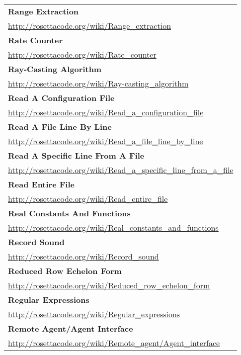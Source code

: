 \begin{longtable}{l}
\textbf{Range Extraction } \\ \href{http://rosettacode.org/wiki/Range\_extraction}{http://rosettacode.org/wiki/Range\_extraction} \\
\textbf{Rate Counter } \\ \href{http://rosettacode.org/wiki/Rate\_counter}{http://rosettacode.org/wiki/Rate\_counter} \\
\textbf{
Ray-Casting Algorithm } \\ \href{http://rosettacode.org/wiki/Ray-casting\_algorithm}{http://rosettacode.org/wiki/Ray-casting\_algorithm} \\
\textbf{Read A Configuration File } \\ \href{http://rosettacode.org/wiki/Read\_a\_configuration\_file}{http://rosettacode.org/wiki/Read\_a\_configuration\_file} \\
\textbf{
Read A File Line By Line } \\ \href{http://rosettacode.org/wiki/Read\_a\_file\_line\_by\_line}{http://rosettacode.org/wiki/Read\_a\_file\_line\_by\_line} \\
\textbf{Read A Specific Line From A File } \\ \href{http://rosettacode.org/wiki/Read\_a\_specific\_line\_from\_a\_file}{http://rosettacode.org/wiki/Read\_a\_specific\_line\_from\_a\_file} \\
\textbf{
Read Entire File } \\ \href{http://rosettacode.org/wiki/Read\_entire\_file}{http://rosettacode.org/wiki/Read\_entire\_file} \\
\textbf{Real Constants And Functions } \\ \href{http://rosettacode.org/wiki/Real\_constants\_and\_functions}{http://rosettacode.org/wiki/Real\_constants\_and\_functions} \\
\textbf{Record Sound } \\ \href{http://rosettacode.org/wiki/Record\_sound}{http://rosettacode.org/wiki/Record\_sound} \\
\textbf{
Reduced Row Echelon Form } \\ \href{http://rosettacode.org/wiki/Reduced\_row\_echelon\_form}{http://rosettacode.org/wiki/Reduced\_row\_echelon\_form} \\
\textbf{Regular Expressions } \\ \href{http://rosettacode.org/wiki/Regular\_expressions}{http://rosettacode.org/wiki/Regular\_expressions} \\
\textbf{
Remote Agent/Agent Interface } \\ \href{http://rosettacode.org/wiki/Remote\_agent/Agent\_interface}{http://rosettacode.org/wiki/Remote\_agent/Agent\_interface} \\

\end{longtable}
